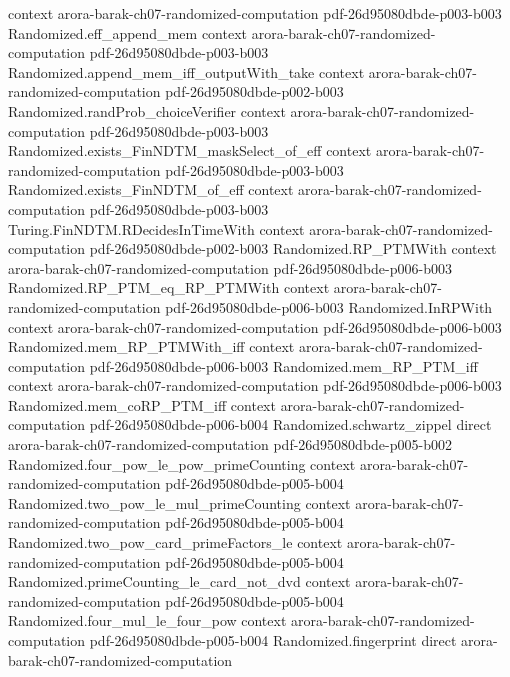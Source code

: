 \begin{theorem}
  {context}
  {arora-barak-ch07-randomized-computation}
  {pdf-26d95080dbde-p003-b003}
\proofstep
  {Randomized.eff_append_mem}
  {context}
  {arora-barak-ch07-randomized-computation}
  {pdf-26d95080dbde-p003-b003}
\proofstep
  {Randomized.append_mem_iff_outputWith_take}
  {context}
  {arora-barak-ch07-randomized-computation}
  {pdf-26d95080dbde-p002-b003}
\proofstep
  {Randomized.randProb_choiceVerifier}
  {context}
  {arora-barak-ch07-randomized-computation}
  {pdf-26d95080dbde-p003-b003}
\proofstep
  {Randomized.exists_FinNDTM_maskSelect_of_eff}
  {context}
  {arora-barak-ch07-randomized-computation}
  {pdf-26d95080dbde-p003-b003}
\proofstep
  {Randomized.exists_FinNDTM_of_eff}
  {context}
  {arora-barak-ch07-randomized-computation}
  {pdf-26d95080dbde-p003-b003}
\proofstep
  {Turing.FinNDTM.RDecidesInTimeWith}
  {context}
  {arora-barak-ch07-randomized-computation}
  {pdf-26d95080dbde-p002-b003}
\proofstep
  {Randomized.RP_PTMWith}
  {context}
  {arora-barak-ch07-randomized-computation}
  {pdf-26d95080dbde-p006-b003}
\proofstep
  {Randomized.RP_PTM_eq_RP_PTMWith}
  {context}
  {arora-barak-ch07-randomized-computation}
  {pdf-26d95080dbde-p006-b003}
\proofstep
  {Randomized.InRPWith}
  {context}
  {arora-barak-ch07-randomized-computation}
  {pdf-26d95080dbde-p006-b003}
\proofstep
  {Randomized.mem_RP_PTMWith_iff}
  {context}
  {arora-barak-ch07-randomized-computation}
  {pdf-26d95080dbde-p006-b003}
\proofstep
  {Randomized.mem_RP_PTM_iff}
  {context}
  {arora-barak-ch07-randomized-computation}
  {pdf-26d95080dbde-p006-b003}
\proofstep
  {Randomized.mem_coRP_PTM_iff}
  {context}
  {arora-barak-ch07-randomized-computation}
  {pdf-26d95080dbde-p006-b004}
\proofstep
  {Randomized.schwartz_zippel}
  {direct}
  {arora-barak-ch07-randomized-computation}
  {pdf-26d95080dbde-p005-b002}
\proofstep
  {Randomized.four_pow_le_pow_primeCounting}
  {context}
  {arora-barak-ch07-randomized-computation}
  {pdf-26d95080dbde-p005-b004}
\proofstep
  {Randomized.two_pow_le_mul_primeCounting}
  {context}
  {arora-barak-ch07-randomized-computation}
  {pdf-26d95080dbde-p005-b004}
\proofstep
  {Randomized.two_pow_card_primeFactors_le}
  {context}
  {arora-barak-ch07-randomized-computation}
  {pdf-26d95080dbde-p005-b004}
\proofstep
  {Randomized.primeCounting_le_card_not_dvd}
  {context}
  {arora-barak-ch07-randomized-computation}
  {pdf-26d95080dbde-p005-b004}
\proofstep
  {Randomized.four_mul_le_four_pow}
  {context}
  {arora-barak-ch07-randomized-computation}
  {pdf-26d95080dbde-p005-b004}
\proofstep
  {Randomized.fingerprint}
  {direct}
  {arora-barak-ch07-randomized-computation}

\end{theorem}
